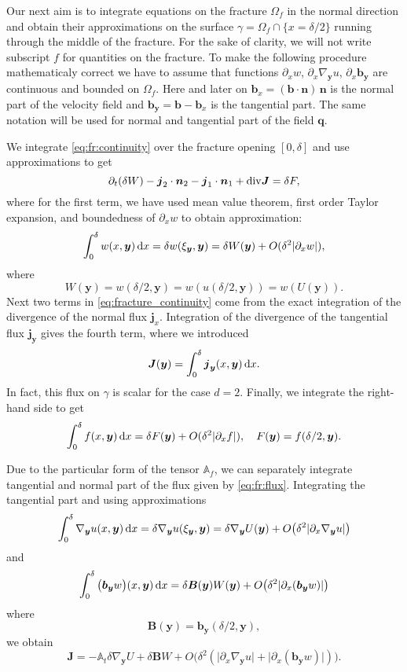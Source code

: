 \documentclass[12pt,a4paper]{report}
\def\prtl{\partial}
\def\vc#1{\mathbf{\boldsymbol{#1}}}     %
\def\tn#1{{\mathbb{#1}}}    %
\def\abs#1{\lvert#1\rvert}
\def\div{{\rm div}}
\def\grad{\nabla}
\def\d {\,{\rm d}}
\begin{document}
Our next aim is to integrate equations on the fracture $\Omega_f$ in the normal direction 
and obtain their approximations on the surface $\gamma=\Omega_f \cap \{x=\delta/2\}$ running through the middle of the fracture. 
For the sake of clarity, we will not write subscript $f$ for quantities on the fracture. 
To make the following procedure mathematicaly correct we have to assume that functions
$\prtl_x w$, $\prtl_x \grad_{\vc y} u$, $\prtl_x \vc b_{\vc y}$ are continuous and bounded on $\Omega_f$. Here and later on 
$\vc b_x=(\vc b \cdot \vc n)\, \vc n$ is the normal part of the velocity field and $\vc b_{\vc y} = \vc b - \vc b_x$ is the tangential part.
The same notation will be used for normal and tangential part of the field $\vc q$.

We integrate \eqref{eq:fr:continuity} over the fracture opening $[0,\delta]$ and use approximations to get
\begin{equation}
    \label{eq:fracture_continuity}
   \prtl_t (\delta W) - \vc j_2 \cdot \vc n_2 - \vc j_1 \cdot \vc n_1 + \div \vc J = \delta F,
\end{equation}
where for the first term, we have used mean value theorem, first order Taylor expansion, 
and boundedness of $\prtl_x w$ to obtain approximation:
\[
    \int_0^\delta w(x,\vc y) \d x=\delta w(\xi_{\vc y}, \vc y) = \delta W(\vc y) + O(\delta^2\abs{\prtl_x w}),
\]
where
\[
    W(\vc y)=w(\delta / 2,\vc y)=w(u(\delta/2,\vc y))=w(U(\vc y)).
\]
Next two terms in \eqref{eq:fracture_continuity} come from the exact integration 
of the divergence of the normal flux $\vc j_x$.
Integration of the divergence of the tangential flux $\vc j_{\vc y}$ gives the fourth term, where we introduced
\[
\vc J(\vc y) = \int_0^\delta \vc j_{\vc y}(x, \vc y) \d x.
\]
In fact, this flux on $\gamma$ is scalar for the case $d=2$. Finally, we integrate the right-hand side to get 
\[
    \int_0^\delta f(x,\vc y) \d x = \delta F(\vc y) + O(\delta^2\abs{\prtl_x f}),\quad F(\vc y)=f(\delta/2,\vc y). 
\]


Due to the particular form of the tensor $\tn A_f$, we can separately integrate tangential and normal
part of the flux given by \eqref{eq:fr:flux}. Integrating the tangential part and using approximations
\[
    \int_0^\delta  \grad_{\vc y} u(x, \vc y) \d x = \delta \grad_{\vc y} u (\xi_{\vc y}, \vc y) 
    = \delta \grad_{\vc y} U( \vc y) + O\big( \delta^2 \abs{\prtl_x\grad_{\vc y} u} \big) 
\]
and
\[
 \int_0^\delta \big(\vc b_{\vc y} w\big)(x, \vc y) \d x 
  = \delta \vc B(\vc y) W(\vc y) + O\big(\delta^2 \abs{\prtl_x(\vc b_{\vc y} w)} \big)
\]
where
\[
  \vc B(\vc y) = \vc b_{\vc y}(\delta/2, \vc y),
\]
we obtain
\begin{equation}
    \label{eq:fracture_darcy}
   \vc J = -\tn A_t \delta \grad_{\vc y} U + \delta \vc B W + O\big(\delta^2(\abs{\prtl_x\grad_{\vc y} u}+\abs{\prtl_x(\vc b_{\vc y} w)})\big).
\end{equation}
\end{document}
